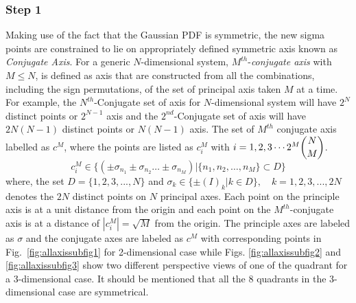 \documentclass[letterpaper, 10 pt, conference]{IEEEtran}  %
\begin{document}
\subsubsection*{Step 1} Making use of the fact that the Gaussian PDF is symmetric, the new sigma points are constrained to lie on appropriately defined symmetric axis known as \textit{Conjugate Axis}. %
For a generic $N$-dimensional system, $M^{th}$-\textit{conjugate axis} with $M\le N$, is defined as axis that are constructed from all the combinations, including the sign permutations, of the set of principal axis taken $M$ at a time. For example, the $N^{th}$-Conjugate set of axis for $N$-dimensional system will have $2^N$ distinct points or $2^{N-1}$ axis and the $2^{nd}$-Conjugate set of axis will have $2N(N-1)$ distinct points or $N(N-1)$ axis. The set of $M^{th}$ conjugate axis labelled as  $c^M$, where the points are listed as $c^M_i$ with $i=1,2,3\cdots 2^M\dbinom{N}{M}$.
\vspace{-0.05in}
\begin{equation} 
c^M_i\in\{(\pm\sigma_{n_1}\pm\sigma_{n_2} \ldots \pm \sigma_{n_M})|\{n_1,n_2,\ldots,n_M\}\subset D\}
\end{equation}
\vspace{-0.001in}
where, the set $D=\{1,2,3,...,N\}$ and $\sigma_k \in \{\pm(I)_k|k\in D\},\quad k=1,2,3,...,2N$ denotes the $2N$ distinct points on $N$ principal axes. Each point on the principle axis is at a unit distance from the origin and each point on the $M^{th}$-conjugate axis is at a distance of $|c^M_i|=\sqrt{M}$ from the origin. The principle axes are labeled as $\sigma$ and the conjugate axes are labeled as $c^M$ with corresponding points  in Fig.~\ref{fig:allaxissubfig1} for 2-dimensional case while  Figs. \ref{fig:allaxissubfig2} and \ref{fig:allaxissubfig3} show two different perspective views of one of the quadrant for a 3-dimensional case. It should be mentioned that all the 8 quadrants in the 3-dimensional case are symmetrical.
\end{document}
